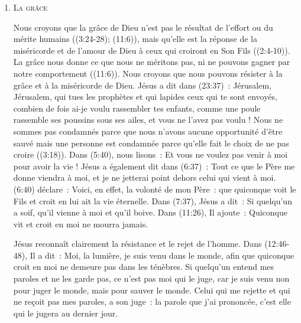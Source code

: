 \begin{enumerate}
  \item  \textsc{La grâce}

\nobreak
\begin{pocketpar}{}
Nous croyons que la grâce de Dieu n'est pas le résultat de l'effort
 ou du mérite humains
 ((3:24-28); (11:6)),
 mais qu'elle est la réponse
 de la miséricorde et de l'amour de Dieu à ceux qui croiront en Son Fils
 ((2:4-10)).
 La grâce nous donne 
 ce que nous ne méritons pas, ni ne pouvons gagner par notre comportement
 ((11:6)).
 Nous croyons que nous pouvons résister à la grâce et à la miséricorde de Dieu.
 Jésus a dit dans (23:37)~:
 \og Jérusalem, Jérusalem, qui tues les prophètes et qui lapides ceux
 qui te sont envoyés, combien de fois ai-je voulu rassembler tes enfants,
 comme une poule rassemble ses poussins sous ses ailes, et vous ne l'avez pas voulu ! \fg{}
 Nous ne sommes pas condamnés parce que nous n'avons aucune opportunité d'être sauvé
 mais une personne est condamnée parce qu'elle fait le choix de ne pas croire
 ((3:18)).
 Dans (5:40), nous lisons~:
 \og Et vous ne voulez pas venir à moi pour avoir la vie ! \fg{}
 Jésus a également dit dans (6:37)~:
 \og Tout ce que le Père me donne viendra à moi,
 et je ne jetterai point dehors celui qui vient à moi. \fg{}
 (6:40) déclare~:
 \og Voici, en effet, la volonté de mon Père~: que quiconque voit le Fils
 et croit en lui ait la vie éternelle. \fg{}
 Dans (7:37), Jésus a dit~:
 \og Si quelqu'un a soif, qu'il vienne à moi et qu'il boive. \fg{}
 Dans (11:26), Il ajoute~:
 \og Quiconque vit et croit en moi ne mourra jamais. \fg{}
\end{pocketpar}

Jésus reconnaît clairement la résistance et le rejet de l'hom\-me.
 Dans (12:46-48), Il a dit~:
 \og Moi, la lumière, je suis venu dans le monde, afin que quiconque croit
 en moi ne demeure pas dans les ténèbres. Si quelqu'un entend mes paroles
 et ne les garde pas, ce n'est pas moi qui le juge, car je suis venu non
 pour juger le monde, mais pour sauver le monde. Celui qui me rejette et qui
 ne reçoit pas mes paroles, a son juge~: la parole que j'ai prononcée,
 c'est elle qui le jugera au dernier jour. \fg{}


\end{enumerate}
